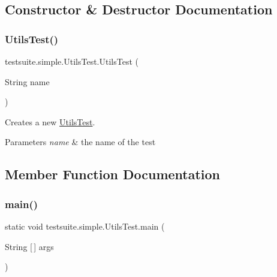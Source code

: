 \subsection{Constructor \& Destructor Documentation}
\mbox{\label{classtestsuite_1_1simple_1_1_utils_test_ae8295b4d62a676991726c1e76e0192e9}} 
\subsubsection{\texorpdfstring{Utils\+Test()}{UtilsTest()}}
{\footnotesize\ttfamily testsuite.\+simple.\+Utils\+Test.\+Utils\+Test (\begin{DoxyParamCaption}\item[{String}]{name }\end{DoxyParamCaption})}

Creates a new \mbox{\hyperlink{classtestsuite_1_1simple_1_1_utils_test}{Utils\+Test}}.


\begin{DoxyParams}{Parameters}
{\em name} & the name of the test \\
\hline
\end{DoxyParams}


\subsection{Member Function Documentation}
\mbox{\label{classtestsuite_1_1simple_1_1_utils_test_a131ce08ba1049981947b3982e95d9e34}} 
\subsubsection{\texorpdfstring{main()}{main()}}
{\footnotesize\ttfamily static void testsuite.\+simple.\+Utils\+Test.\+main (\begin{DoxyParamCaption}\item[{String \mbox{[}$\,$\mbox{]}}]{args }\end{DoxyParamCaption})\hspace{0.3cm}{\ttfamily [static]}}

